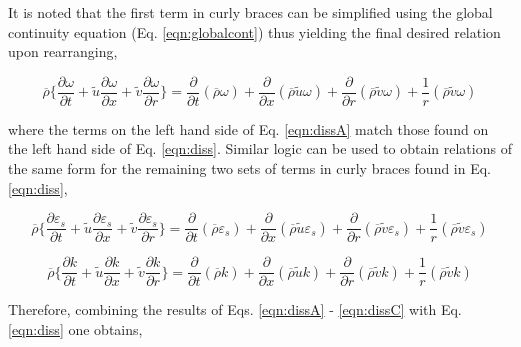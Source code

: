 	It is noted that the first term in curly braces can be simplified using the global continuity equation 
(Eq. \ref{eqn:globalcont}) thus yielding the final desired relation upon rearranging,

\begin{equation}
	\overline{\rho}\Big\{\frac{\partial\omega}{\partial t} + \tilde u\frac{\partial\omega}{\partial x}
	+ \tilde v\frac{\partial\omega}{\partial r}\Big\} = \frac{\partial}{\partial t}(\overline{\rho}\omega)
	+ \frac{\partial}{\partial x}(\overline{\rho}\tilde u\omega)+ \frac{\partial}{\partial r}(\overline{\rho}\tilde v\omega)
	+ \frac{1}{r}(\overline{\rho}\tilde v\omega)
\label{eqn:dissA}
\end{equation}

	where the terms on the left hand side of Eq. \ref{eqn:dissA} match those found on the left hand side
of Eq. \ref{eqn:diss}.  Similar logic can be used to obtain relations of the same form for the remaining
two sets of terms in curly braces found in Eq. \ref{eqn:diss},

\begin{equation}
	\overline{\rho}\Big\{\frac{\partial\varepsilon_s}{\partial t} + \tilde u\frac{\partial\varepsilon_s}{\partial x}
	+ \tilde v\frac{\partial\varepsilon_s}{\partial r}\Big\} = \frac{\partial}{\partial t}(\overline{\rho}\varepsilon_s)
	+ \frac{\partial}{\partial x}(\overline{\rho}\tilde u\varepsilon_s)
	+ \frac{\partial}{\partial r}(\overline{\rho}\tilde v\varepsilon_s)
	+ \frac{1}{r}(\overline{\rho}\tilde v\varepsilon_s)
\label{eqn:dissB}
\end{equation}

\begin{equation}
	\overline{\rho}\Big\{\frac{\partial k}{\partial t} + \tilde u\frac{\partial k}{\partial x}
	+ \tilde v\frac{\partial k}{\partial r}\Big\} = \frac{\partial}{\partial t}(\overline{\rho}k)
	+ \frac{\partial}{\partial x}(\overline{\rho}\tilde u k)+ \frac{\partial}{\partial r}(\overline{\rho}\tilde v k)
	+ \frac{1}{r}(\overline{\rho}\tilde v k)
\label{eqn:dissC}
\end{equation}

	Therefore, combining the results of Eqs. \ref{eqn:dissA} - \ref{eqn:dissC} with Eq. \ref{eqn:diss} one obtains,

